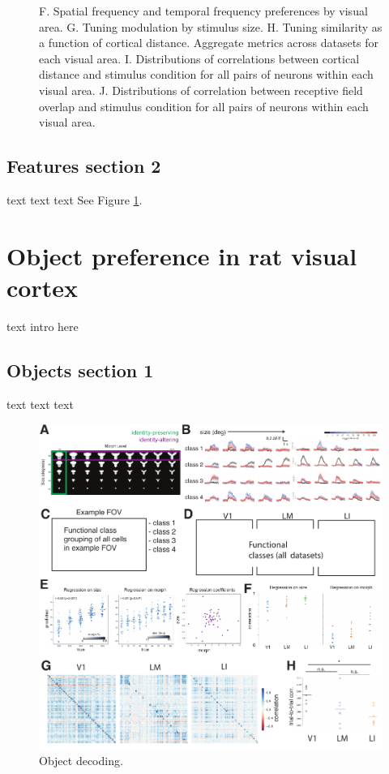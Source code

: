 \documentclass{article}
\begin{document}
\begin{figure}[ht]
  F.  Spatial frequency and temporal frequency preferences by visual area.
  G.  Tuning modulation by stimulus size.
  H.  Tuning similarity as a function of cortical distance.  Aggregate metrics across datasets for each visual area.
  I.  Distributions of correlations between cortical distance and stimulus condition for all pairs of neurons within each visual area. 
  J.  Distributions of correlation between receptive field overlap and stimulus condition for all pairs of neurons within each visual area.
  \label{fig:fig3}
\end{figure}

\subsection{Features section 2}
text text text
See Figure \ref{fig:fig3}.


\section{Object preference in rat visual cortex}
text intro here

\subsection{Objects section 1}
text text text

\begin{figure}[ht]
  \includegraphics[width=\textwidth]{figures/objects.pdf}
  \caption{Object decoding.}
  \label{fig:fig4}
\end{figure}
\end{document}

